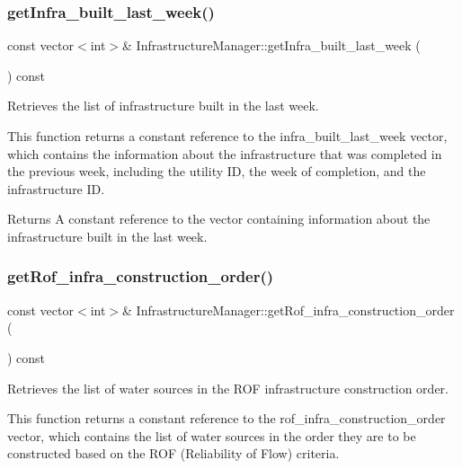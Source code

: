 \subsubsection{\texorpdfstring{get\+Infra\+\_\+built\+\_\+last\+\_\+week()}{getInfra\_built\_last\_week()}}
{\footnotesize\ttfamily const vector$<$int$>$\& Infrastructure\+Manager\+::get\+Infra\+\_\+built\+\_\+last\+\_\+week (\begin{DoxyParamCaption}{ }\end{DoxyParamCaption}) const}



Retrieves the list of infrastructure built in the last week. 

This function returns a constant reference to the {\ttfamily infra\+\_\+built\+\_\+last\+\_\+week} vector, which contains the information about the infrastructure that was completed in the previous week, including the utility ID, the week of completion, and the infrastructure ID.

\begin{DoxyReturn}{Returns}
A constant reference to the vector containing information about the infrastructure built in the last week. 
\end{DoxyReturn}
\mbox{\label{classInfrastructureManager_a0f944c7704cc5418ba58b71c7a1e15a7}} 
\subsubsection{\texorpdfstring{get\+Rof\+\_\+infra\+\_\+construction\+\_\+order()}{getRof\_infra\_construction\_order()}}
{\footnotesize\ttfamily const vector$<$int$>$\& Infrastructure\+Manager\+::get\+Rof\+\_\+infra\+\_\+construction\+\_\+order (\begin{DoxyParamCaption}{ }\end{DoxyParamCaption}) const}



Retrieves the list of water sources in the R\+OF infrastructure construction order. 

This function returns a constant reference to the {\ttfamily rof\+\_\+infra\+\_\+construction\+\_\+order} vector, which contains the list of water sources in the order they are to be constructed based on the R\+OF (Reliability of Flow) criteria.

